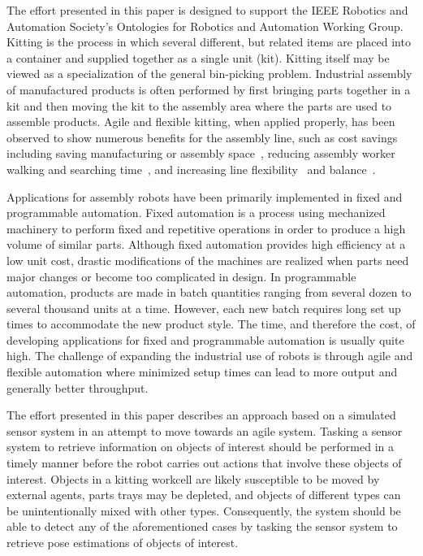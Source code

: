 The effort presented in this paper is designed to support the IEEE Robotics and Automation Society's Ontologies for Robotics and Automation Working Group.
Kitting is the process in which several different, but related items are placed into a container and supplied together as a single unit (kit).
Kitting itself may be viewed as a specialization of the general bin-picking problem. Industrial assembly of manufactured products is often performed by first
bringing parts together in a kit and then moving the kit to the assembly area where the parts are used to assemble products. Agile and flexible kitting, when
applied properly, has been observed to show numerous benefits for the assembly line, such as cost savings~\cite{Carlsson_2008} including saving manufacturing or
assembly space~\cite{Medbo2003}, reducing assembly worker walking and searching time~\cite{Schwind1992}, and increasing line flexibility~\cite{Bozer1992} and
balance~\cite{Jiao2000}.

Applications for assembly robots have been primarily implemented in fixed and programmable automation. Fixed automation is a process using mechanized machinery
to perform fixed and repetitive operations in order to produce a high volume of similar parts. Although fixed automation provides high efficiency at a low unit
cost, drastic modifications of the machines are realized when parts need major changes or become too complicated in design. In programmable automation, products
are made in batch quantities ranging from several dozen to several thousand units at a time. However, each new batch requires long set up times to accommodate the
new product style. The time, and therefore the cost, of developing applications for fixed and programmable automation is usually quite high. The challenge of expanding
the industrial use of robots is through agile and flexible automation where minimized setup times can lead to more output and generally better throughput.

The effort presented in this paper describes an approach based on a simulated sensor system in an attempt to move towards an agile system. Tasking a sensor system
to retrieve information on objects of interest should be performed in a timely manner before the robot carries out actions that involve these objects of interest.
Objects in a kitting workcell are likely susceptible to be moved by external agents, parts trays may be depleted, and objects of different types can be
unintentionally mixed with other types. Consequently, the system should be able to detect any of the aforementioned cases by tasking the sensor system to
retrieve pose estimations of objects of interest.

